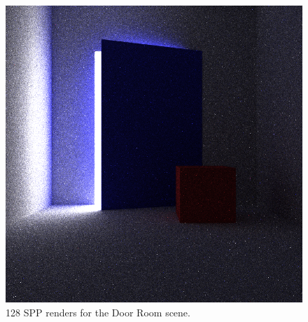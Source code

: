 \documentclass[ %
                    author={Callum Pearce},
                supervisor={Dr. Neill Campbell},
                    degree={MEng},
                     title={Learning the incident radiance for a continuous state space rather than a discrete one is more beneficial for Importance Sampling in Monte Carlo Path tracing},
                  subtitle={},
                      type={research},
                      year={2019} ]{dissertation}
\begin{document}
\begin{figure}[h]
\endminipage\hspace{1em}
  \includegraphics[width=\textwidth]{images/renders/door_room/nn.png}
\endminipage
\caption{128 SPP renders for the Door Room scene.}
\label{fig:door_room}
\end{figure}

\end{document}
